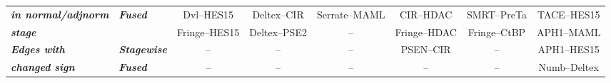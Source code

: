 \documentclass[10pt]{article}
\begin{document}
\begin{table}
\begin{tabular}{|llcccccc|}
\multicolumn{1}{|l|}{\textit{\textbf{in normal/adjnorm}}}    & \multicolumn{1}{l|}{\textit{\textbf{Fused}}}     & \multicolumn{1}{c|}{Dvl--HES15}                                                                  & \multicolumn{1}{c|}{Deltex--CIR}  & \multicolumn{1}{c|}{Serrate--MAML}                                                              & \multicolumn{1}{c|}{CIR--HDAC}                                                                     & \multicolumn{1}{c|}{SMRT--PreTa}                                                                                 & TACE--HES15                                                                               \\ \cline{3-8}
\multicolumn{1}{|l|}{\textit{\textbf{stage}}}                & \multicolumn{1}{l|}{\textit{\textbf{}}}          & \multicolumn{1}{c|}{Fringe--HES15}                                                               & \multicolumn{1}{c|}{Deltex--PSE2} & \multicolumn{1}{c|}{--}                                                                            & \multicolumn{1}{c|}{Fringe--HDAC}                                                                  & \multicolumn{1}{c|}{Fringe--CtBP}                                                                                & APH1--MAML                                                                                \\ \hline
\multicolumn{1}{|l|}{\textit{\textbf{Edges with}}}           & \multicolumn{1}{l|}{\textit{\textbf{Stagewise}}} & \multicolumn{1}{c|}{--}                                                                             & \multicolumn{1}{c|}{--}              & \multicolumn{1}{c|}{--}                                                                            & \multicolumn{1}{c|}{PSEN--CIR}                                                                     & \multicolumn{1}{c|}{--}                                                                                             & APH1--HES15                                                                               \\ \cline{2-8}
\multicolumn{1}{|l|}{\textit{\textbf{changed sign}}}                 & \multicolumn{1}{l|}{\textit{\textbf{Fused}}}     & \multicolumn{1}{c|}{--}                                                                             & \multicolumn{1}{c|}{--}              & \multicolumn{1}{c|}{--}                                                                            & \multicolumn{1}{c|}{--}                                                                               & \multicolumn{1}{c|}{--}                                                                                             & Numb--Deltex                                                                              \\ \hline
\end{tabular}
\end{table}
\end{document}

